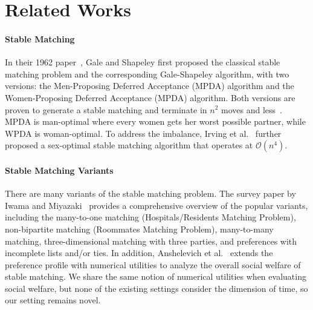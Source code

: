 \section{Related Works}
\paragraph{Stable Matching}
In their 1962 paper~\cite{galeshapley1962}, Gale and Shapeley first proposed the classical stable matching problem and the corresponding
Gale-Shapeley algorithm, with two versions: the Men-Proposing Deferred Acceptance (MPDA) algorithm and the Women-Proposing Deferred Acceptance (MPDA) algorithm. Both versions are proven to generate a stable matching and terminate in $n^2$ moves and less~\cite{irving1989textbook}. MPDA is man-optimal where every women gets her worst possible partner, while WPDA is woman-optimal. To address the imbalance, Irving et al.~\cite{irving1987efficient} further proposed a sex-optimal stable matching algorithm that operates at $\mathcal{O}(n^4)$.

\paragraph{Stable Matching Variants}
There are many variants of the stable matching problem. The survey paper by Iwama and Miyazaki~\cite{iwama2008survey} provides a comprehensive overview of the popular variants, including the many-to-one matching (Hospitals/Residents Matching Problem), non-bipartite matching (Roommates Matching Problem), many-to-many matching, three-dimensional matching with three parties, and preferences with incomplete lists and/or ties. In addition, Anshelevich et al.~\cite{Anshelevich2013} extends the preference profile with numerical utilities to analyze the overall social welfare of stable matching. We share the same notion of numerical utilities when evaluating social welfare, but none of the existing settings consider the dimension of time, so our setting remains novel.